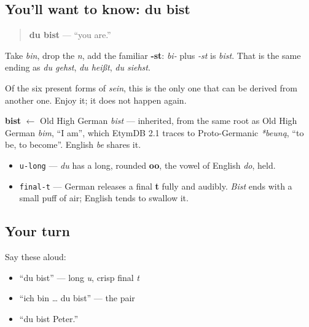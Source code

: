 \subsection*{You'll want to know: du bist}
\begin{quote}
\textbf{du bist} — \textquotedblleft{}you are.\textquotedblright{}
\end{quote}

Take \emph{bin}, drop the \emph{n}, add the familiar \textbf{-st}: \emph{bi-} plus \emph{-st} is \emph{bist}. That is the same ending as \emph{du gehst}, \emph{du heißt}, \emph{du siehst}.

Of the six present forms of \emph{sein}, this is the only one that can be derived from another one. Enjoy it; it does not happen again.

\begin{cousinweb}
\textbf{bist} $\leftarrow$ Old High German \emph{bist} — inherited, from the same root as Old High German \emph{bim}, \textquotedblleft{}I am\textquotedblright{}, which EtymDB 2.1 traces to Proto-Germanic \emph{*beuną}, \textquotedblleft{}to be, to become\textquotedblright{}. English \emph{be} shares it.
\end{cousinweb}

\begin{sounds}
\begin{itemize}
\raggedright
  \item \texttt{u-long} — \emph{du} has a long, rounded \textbf{oo}, the vowel of English \emph{do}, held.
  \item \texttt{final-t} — German releases a final \textbf{t} fully and audibly. \emph{Bist} ends with a small puff of air; English tends to swallow it.
\end{itemize}
\end{sounds}

\subsection*{Your turn}
Say these aloud:

\begin{itemize}
\raggedright
  \item \textquotedblleft{}du bist\textquotedblright{} — long \emph{u}, crisp final \emph{t}
  \item \textquotedblleft{}ich bin … du bist\textquotedblright{} — the pair
  \item \textquotedblleft{}du bist Peter.\textquotedblright{}
\end{itemize}

